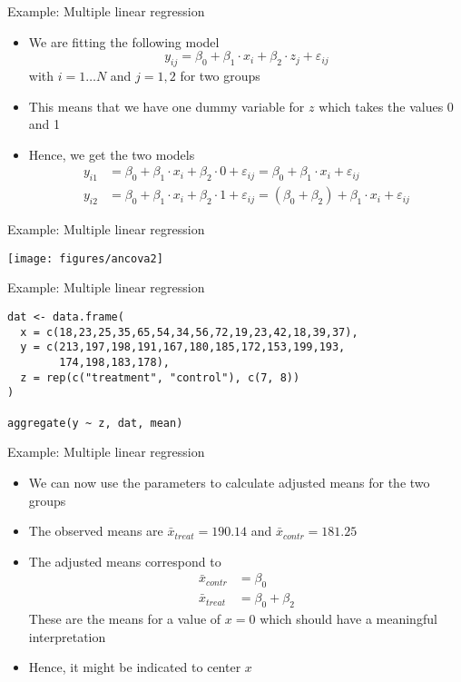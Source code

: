 \documentclass{beamer}
\begin{document}
\begin{frame}[fragile]{Example: Multiple linear regression}
  \begin{itemize}
    \item We are fitting the following model
\[
y_{ij} = \beta_0 + \beta_1 \cdot x_i + \beta_2 \cdot z_j + \varepsilon_{ij}
\]
with $i = 1 \ldots N$ and $j = 1,2$ for two groups
\item This means that we have one dummy variable for $z$ which takes the
  values 0 and 1
\item Hence, we get the two models
\begin{align*}
y_{i1} & = \beta_0 + \beta_1 \cdot x_i + \beta_2\cdot 0 + \varepsilon_{ij}
= \beta_0 + \beta_1 \cdot x_i + \varepsilon_{ij}\\
y_{i2} & = \beta_0 + \beta_1 \cdot x_i + \beta_2\cdot 1 + \varepsilon_{ij}
= (\beta_0 + \beta_2) + \beta_1 \cdot x_i + \varepsilon_{ij}
\end{align*}
  \end{itemize}
\end{frame}

\begin{frame}[fragile]{Example: Multiple linear regression}
\begin{center}
\texttt{[image: figures/ancova2]}
\end{center}
\end{frame}

{

\begin{frame}[fragile]{Example: Multiple linear regression}
\begin{lstlisting}
dat <- data.frame(
  x = c(18,23,25,35,65,54,34,56,72,19,23,42,18,39,37),
  y = c(213,197,198,191,167,180,185,172,153,199,193,
        174,198,183,178),
  z = rep(c("treatment", "control"), c(7, 8))
)

aggregate(y ~ z, dat, mean)
\end{lstlisting}
\end{frame}

}


\begin{frame}[fragile]{Example: Multiple linear regression}
  \begin{itemize}
    \item We can now use the parameters to calculate adjusted means for the
      two groups
    \item The observed means are $\bar x_{treat} = 190.14$ and $\bar
      x_{contr} = 181.25$
    \item The adjusted means correspond to
\begin{align*}
\bar x_{contr} & = \beta_0\\
\bar x_{treat} & = \beta_0 + \beta_2
\end{align*}
These are the means for a value of $x = 0$ which should have a meaningful
interpretation
\item Hence, it might be indicated to center $x$
  \end{itemize}
\end{frame}
\end{document}
